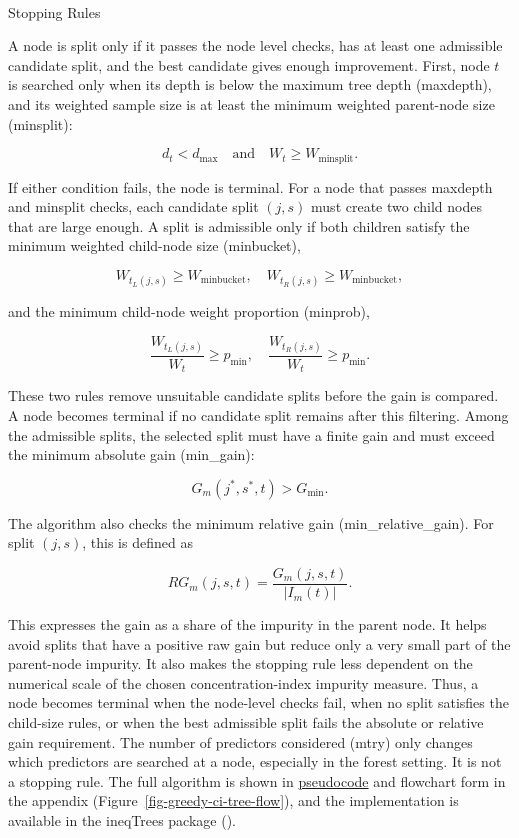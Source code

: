 \documentclass[
  11pt,
  a4paper,
]{article}
\makeatletter
\let\oldparagraph\paragraph
\renewcommand{\paragraph}{
    \@ifstar
      \xxxParagraphStar
      \xxxParagraphNoStar
  }
\newcommand{\xxxParagraphStar}[1]{\oldparagraph*{#1}\mbox{}}
\newcommand{\xxxParagraphNoStar}[1]{\oldparagraph{#1}\mbox{}}
\makeatother
\begin{document}
\paragraph{Stopping Rules}\label{sec-stopping-rules}

A node is split only if it passes the node level checks, has at least
one admissible candidate split, and the best candidate gives enough
improvement. First, node \(t\) is searched only when its depth is below
the maximum tree depth (maxdepth), and its weighted sample size is at
least the minimum weighted parent-node size (minsplit):

\[
d_t < d_{\max}
\quad \text{and} \quad
W_t \geq W_{\mathrm{minsplit}}.
\]

If either condition fails, the node is terminal. For a node that passes
maxdepth and minsplit checks, each candidate split \((j,s)\) must create
two child nodes that are large enough. A split is admissible only if
both children satisfy the minimum weighted child-node size (minbucket),

\[
W_{t_L(j,s)} \geq W_{\mathrm{minbucket}},
\quad
W_{t_R(j,s)} \geq W_{\mathrm{minbucket}},
\]

and the minimum child-node weight proportion (minprob),

\[
\frac{W_{t_L(j,s)}}{W_t} \geq p_{\min},
\quad
\frac{W_{t_R(j,s)}}{W_t} \geq p_{\min}.
\]

These two rules remove unsuitable candidate splits before the gain is
compared. A node becomes terminal if no candidate split remains after
this filtering. Among the admissible splits, the selected split must
have a finite gain and must exceed the minimum absolute gain
(min\_gain):

\[
G_m(j^*,s^*,t) > G_{\mathrm{min}}.
\]

The algorithm also checks the minimum relative gain
(min\_relative\_gain). For split \((j,s)\), this is defined as

\[
RG_m(j,s,t)
=
\frac{G_m(j,s,t)}{|I_m(t)|}.
\]

This expresses the gain as a share of the impurity in the parent node.
It helps avoid splits that have a positive raw gain but reduce only a
very small part of the parent-node impurity. It also makes the stopping
rule less dependent on the numerical scale of the chosen
concentration-index impurity measure. Thus, a node becomes terminal when
the node-level checks fail, when no split satisfies the child-size
rules, or when the best admissible split fails the absolute or relative
gain requirement. The number of predictors considered (mtry) only
changes which predictors are searched at a node, especially in the
forest setting. It is not a stopping rule. The full algorithm is shown
in \hyperref[app-greedy-ci-tree-flow]{pseudocode} and flowchart form in
the appendix (Figure~\ref{fig-greedy-ci-tree-flow}), and the
implementation is available in the ineqTrees package
().
\end{document}
